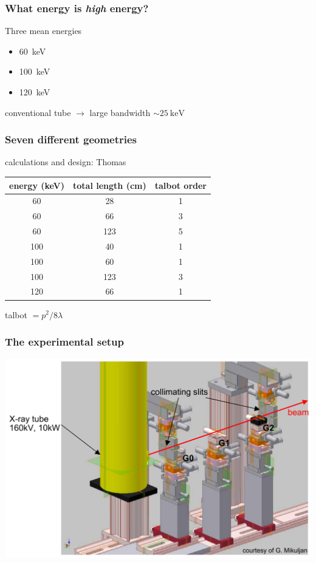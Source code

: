 \documentclass[first,firstsupp]{ETHclass}
\begin{document}
    \begin{frame}
        \frametitle{What energy is \emph{high} energy?}
        Three mean energies
        \begin{itemize}
            \item \SI{60}{\kilo\electronvolt}
            \item \SI{100}{\kilo\electronvolt}
            \item \SI{120}{\kilo\electronvolt}
        \end{itemize}
        conventional tube $\rightarrow$ large bandwidth $\sim \SI{25}{\kilo\electronvolt}$
    \end{frame}

    \begin{frame}
        \frametitle{Seven different geometries}
        calculations and design: Thomas\textcopyright
        \begin{table}
            \centering
            \begin{tabular}{ccc}
                \toprule
                energy (\si{\kilo\electronvolt}) & total length (\si{\centi\metre}) & talbot order \\
                \midrule
                60  & 28  & 1\\
                60  & 66  & 3\\
                60  & 123 & 5\\
                100 & 40  & 1\\
                100 & 60 & 1\\
                100 & 123 & 3\\
                120 & 66 & 1\\
                \bottomrule
            \end{tabular}
        \end{table}
        \tiny{talbot $= p^2 / 8\lambda$}
    \end{frame}

    \begin{frame}
        \frametitle{The experimental setup}
        \includegraphics[width=.9\textwidth]{experimental_setup}
    \end{frame}
\end{document}
